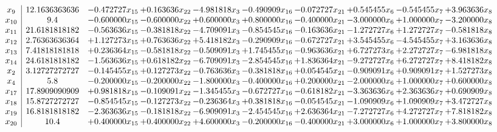 \documentclass[10pt]{article}
\begin{document}
 \[\begin{array}{c| c c@{\hskip 2pt} c@{\hskip 2pt} c@{\hskip 2pt} c@{\hskip 2pt} c@{\hskip 2pt} c@{\hskip 2pt} c@{\hskip 2pt} c@{\hskip 2pt} }
 x_{9}   &  12.1636363636 & -0.472727 x_{15} & + 0.163636 x_{22} & -4.981818 x_{3} & -0.490909 x_{16} & -0.072727 x_{21} & + 0.545455 x_{6} & -0.545455 x_{7} & + 3.963636 x_{8}\\
 x_{10}   &  9.4 & -0.600000 x_{15} & -0.600000 x_{22} & + 0.600000 x_{3} & + 0.800000 x_{16} & -0.400000 x_{21} & -3.000000 x_{6} & + 1.000000 x_{7} & -3.200000 x_{8}\\
 x_{11}   &  21.6181818182 & -0.563636 x_{15} & -0.381818 x_{22} & -4.709091 x_{3} & -0.854545 x_{16} & -0.163636 x_{21} & -1.272727 x_{6} & + 1.272727 x_{7} & -0.581818 x_{8}\\
 x_{12}   &  2.76363636364 & + 1.127273 x_{15} & + 0.763636 x_{22} & + 5.418182 x_{3} & -0.290909 x_{16} & -0.672727 x_{21} & + 3.545455 x_{6} & -4.545455 x_{7} & + 3.163636 x_{8}\\
 x_{13}   &  7.41818181818 & + 0.236364 x_{15} & -0.581818 x_{22} & -0.509091 x_{3} & + 1.745455 x_{16} & -0.963636 x_{21} & + 6.727273 x_{6} & + 2.272727 x_{7} & -6.981818 x_{8}\\
 x_{14}   &  24.6181818182 & -1.563636 x_{15} & + 0.618182 x_{22} & -6.709091 x_{3} & -2.854545 x_{16} & + 1.836364 x_{21} & -9.272727 x_{6} & + 6.272727 x_{7} & + 8.418182 x_{8}\\
 x_{2}   &  3.12727272727 & -0.145455 x_{15} & + 0.127273 x_{22} & -0.763636 x_{3} & -0.381818 x_{16} & + 0.054545 x_{21} & -0.909091 x_{6} & + 0.909091 x_{7} & + 1.527273 x_{8}\\
 x_{4}   &  5.8 & -0.200000 x_{15} & -0.200000 x_{22} & -1.800000 x_{3} & -0.400000 x_{16} & + 0.200000 x_{21} & -2.000000 x_{6} & + 1.000000 x_{7} & + 0.600000 x_{8}\\
 x_{17}   &  17.8909090909 & + 0.981818 x_{15} & -0.109091 x_{22} & -1.345455 x_{3} & -0.672727 x_{16} & -0.618182 x_{21} & -3.363636 x_{6} & + 2.363636 x_{7} & + 0.690909 x_{8}\\
 x_{18}   &  15.8727272727 & -0.854545 x_{15} & -0.127273 x_{22} & -0.236364 x_{3} & + 0.381818 x_{16} & -0.054545 x_{21} & -1.090909 x_{6} & + 1.090909 x_{7} & + 3.472727 x_{8}\\
 x_{19}   &  16.8181818182 & -2.363636 x_{15} & -0.181818 x_{22} & -6.909091 x_{3} & -2.454545 x_{16} & + 2.636364 x_{21} & -7.272727 x_{6} & + 4.272727 x_{7} & + 7.818182 x_{8}\\
 x_{20}   &  10.4 & + 0.400000 x_{15} & + 0.400000 x_{22} & + 4.600000 x_{3} & -0.200000 x_{16} & -0.400000 x_{21} & + 3.000000 x_{6} & + 1.000000 x_{7} & + 3.800000 x_{8}\\

\end{array}\]
\end{document}
